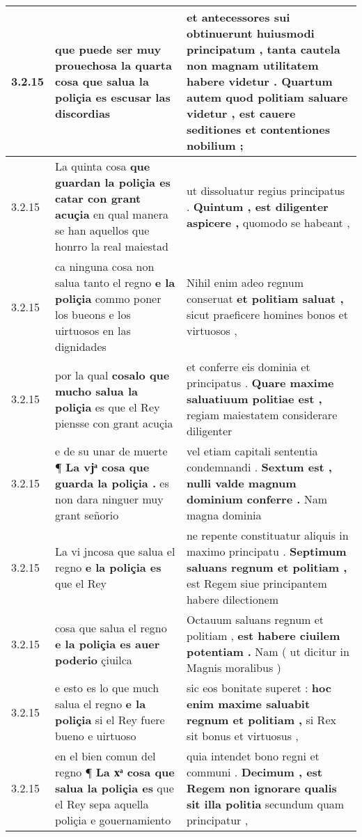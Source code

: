 \begin{tabular}{|p{1cm}|p{6.5cm}|p{6.5cm}|}
3.2.15 & que puede ser muy prouechosa la quarta cosa \textbf{ que salua la poliçia } es escusar las discordias & et antecessores sui obtinuerunt huiusmodi principatum , tanta cautela non magnam utilitatem habere videtur . \textbf{ Quartum autem quod politiam saluare videtur , } est cauere seditiones et contentiones nobilium ; \\\hline
3.2.15 & La quinta cosa \textbf{ que guardan la poliçia es catar con grant acuçia } en qual manera se han aquellos que honrro la real maiestad & ut dissoluatur regius principatus . \textbf{ Quintum , est diligenter aspicere , } quomodo se habeant , \\\hline
3.2.15 & ca ninguna cosa non salua tanto el regno \textbf{ e la poliçia } commo poner los bueons e los uirtuosos en las dignidades & Nihil enim adeo regnum conseruat \textbf{ et politiam saluat , } sicut praeficere homines bonos et virtuosos , \\\hline
3.2.15 & por la qual \textbf{ cosalo que mucho salua la poliçia } es que el Rey piensse con grant acuçia & et conferre eis dominia et principatus . \textbf{ Quare maxime saluatiuum politiae est , } regiam maiestatem considerare diligenter \\\hline
3.2.15 & e de su unar de muerte ¶ \textbf{ La vjͣ cosa que guarda la poliçia . } es non dara ninguer muy grant señorio & vel etiam capitali sententia condemnandi . \textbf{ Sextum est , nulli valde magnum dominium conferre . } Nam magna dominia \\\hline
3.2.15 & La vi jncosa que salua el regno \textbf{ e la poliçia es } que el Rey & ne repente constituatur aliquis in maximo principatu . \textbf{ Septimum saluans regnum et politiam , } est Regem siue principantem habere dilectionem \\\hline
3.2.15 & cosa que salua el regno \textbf{ e la poliçia es auer poderio } çiuilca & Octauum saluans regnum et politiam , \textbf{ est habere ciuilem potentiam . } Nam ( ut dicitur in Magnis moralibus ) \\\hline
3.2.15 & e esto es lo que much salua el regno \textbf{ e la poliçia } si el Rey fuere bueno e uirtuoso & sic eos bonitate superet : \textbf{ hoc enim maxime saluabit regnum et politiam , } si Rex sit bonus et virtuosus , \\\hline
3.2.15 & en el bien comun del regno ¶ \textbf{ La xͣ cosa que salua la poliçia es } que el Rey sepa aquella poliçia e gouernamiento & quia intendet bono regni et communi . \textbf{ Decimum , est Regem non ignorare qualis sit illa politia } secundum quam principatur , \\\hline

\end{tabular}
